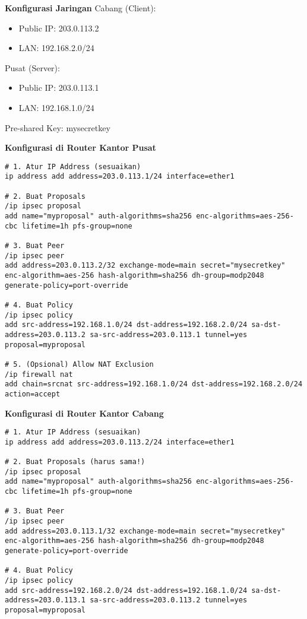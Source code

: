 \begin{enumerate}
	\textbf{Konfigurasi Jaringan}
	Cabang (Client):
	\begin{itemize}
		\item Public IP: 203.0.113.2
		\item LAN: 192.168.2.0/24
	\end{itemize}
	Pusat (Server):
	\begin{itemize}
		\item Public IP: 203.0.113.1
		\item LAN: 192.168.1.0/24
	\end{itemize}

	Pre-shared Key: mysecretkey

	\noindent\textbf{Konfigurasi di Router Kantor Pusat}
\begin{verbatim}
# 1. Atur IP Address (sesuaikan)
ip address add address=203.0.113.1/24 interface=ether1

# 2. Buat Proposals
/ip ipsec proposal
add name="myproposal" auth-algorithms=sha256 enc-algorithms=aes-256-cbc lifetime=1h pfs-group=none

# 3. Buat Peer
/ip ipsec peer
add address=203.0.113.2/32 exchange-mode=main secret="mysecretkey" enc-algorithm=aes-256 hash-algorithm=sha256 dh-group=modp2048 generate-policy=port-override

# 4. Buat Policy
/ip ipsec policy
add src-address=192.168.1.0/24 dst-address=192.168.2.0/24 sa-dst-address=203.0.113.2 sa-src-address=203.0.113.1 tunnel=yes proposal=myproposal

# 5. (Opsional) Allow NAT Exclusion
/ip firewall nat
add chain=srcnat src-address=192.168.1.0/24 dst-address=192.168.2.0/24 action=accept
\end{verbatim}

\noindent\textbf{Konfigurasi di Router Kantor Cabang}
\begin{verbatim}
# 1. Atur IP Address (sesuaikan)
ip address add address=203.0.113.2/24 interface=ether1

# 2. Buat Proposals (harus sama!)
/ip ipsec proposal
add name="myproposal" auth-algorithms=sha256 enc-algorithms=aes-256-cbc lifetime=1h pfs-group=none

# 3. Buat Peer
/ip ipsec peer
add address=203.0.113.1/32 exchange-mode=main secret="mysecretkey" enc-algorithm=aes-256 hash-algorithm=sha256 dh-group=modp2048 generate-policy=port-override

# 4. Buat Policy
/ip ipsec policy
add src-address=192.168.2.0/24 dst-address=192.168.1.0/24 sa-dst-address=203.0.113.1 sa-src-address=203.0.113.2 tunnel=yes proposal=myproposal


\end{verbatim}
\end{enumerate}
